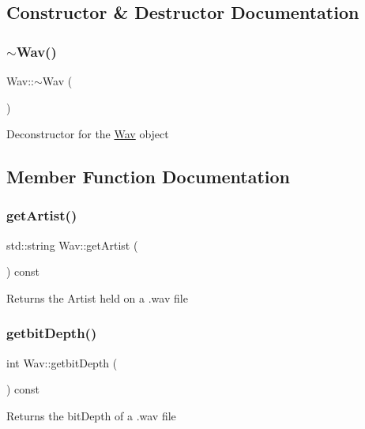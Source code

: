 \subsection{Constructor \& Destructor Documentation}
\mbox{\label{classWav_a1510b246ba121b103a60b8e7839af25f}} 
\subsubsection{\texorpdfstring{$\sim$\+Wav()}{~Wav()}}
{\footnotesize\ttfamily Wav\+::$\sim$\+Wav (\begin{DoxyParamCaption}{ }\end{DoxyParamCaption})\hspace{0.3cm}{\ttfamily [virtual]}}

Deconstructor for the \hyperlink{classWav}{Wav} object 

\subsection{Member Function Documentation}
\mbox{\label{classWav_ab7049943bab3ee9bf8c6ca4043989f3c}} 
\subsubsection{\texorpdfstring{get\+Artist()}{getArtist()}}
{\footnotesize\ttfamily std\+::string Wav\+::get\+Artist (\begin{DoxyParamCaption}{ }\end{DoxyParamCaption}) const}

Returns the Artist held on a .wav file \mbox{\label{classWav_ac09aa7f7d656a42bffdfafa737c0bce8}} 
\subsubsection{\texorpdfstring{getbit\+Depth()}{getbitDepth()}}
{\footnotesize\ttfamily int Wav\+::getbit\+Depth (\begin{DoxyParamCaption}{ }\end{DoxyParamCaption}) const}

Returns the bit\+Depth of a .wav file \mbox{\label{classWav_a2daf07a90ed34789e3a1874973d9bd36}} 
